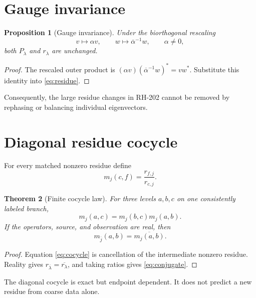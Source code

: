 \documentclass[12pt]{article}
\newtheorem{theorem}{Theorem}[section]\newtheorem{proposition}[theorem]{Proposition}
\theoremstyle{remark}\newtheorem{remark}[theorem]{Remark}
\begin{document}
\section{Gauge invariance}

\begin{proposition}[Gauge invariance]\label{prop:gauge}
Under the biorthogonal rescaling
\begin{equation*}
 v\mapsto \alpha v,\qquad
 w\mapsto \overline\alpha^{-1}w,
 \qquad \alpha\ne0,
\end{equation*}
both $P_\lambda$ and $r_\lambda$ are unchanged.
\end{proposition}

\begin{proof}
The rescaled outer product is
$(\alpha v)(\overline\alpha^{-1}w)^*=vw^*$.  Substitute this identity into
\eqref{eq:residue}.
\end{proof}

Consequently, the large residue changes in RH-202 cannot be removed by
rephasing or balancing individual eigenvectors.

\section{Diagonal residue cocycle}

For every matched nonzero residue define
\begin{equation}\label{eq:multiplier}
 m_j(c,f)=\frac{r_{f,j}}{r_{c,j}}.
\end{equation}

\begin{theorem}[Finite cocycle law]\label{thm:cocycle}
For three levels $a,b,c$ on one consistently labeled branch,
\begin{equation}\label{eq:cocycle}
 m_j(a,c)=m_j(b,c)m_j(a,b).
\end{equation}
If the operators, source, and observation are real, then
\begin{equation}\label{eq:conjugate}
 m_{\overline j}(a,b)=\overline{m_j(a,b)}.
\end{equation}
\end{theorem}

\begin{proof}
Equation \eqref{eq:cocycle} is cancellation of the intermediate nonzero
residue.  Reality gives
$r_{\overline\lambda}=\overline{r_\lambda}$, and taking ratios gives
\eqref{eq:conjugate}.
\end{proof}

The diagonal cocycle is exact but endpoint dependent.  It does not predict a
new residue from coarse data alone.
\end{document}
